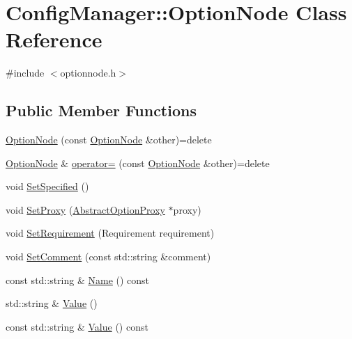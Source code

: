 \hypertarget{class_config_manager_1_1_option_node}{}\section{Config\+Manager\+:\+:Option\+Node Class Reference}
\label{class_config_manager_1_1_option_node}


{\ttfamily \#include $<$optionnode.\+h$>$}

\subsection*{Public Member Functions}
\begin{DoxyCompactItemize}
\item 
\hyperlink{class_config_manager_1_1_option_node_a645c010a3f2e7e8f46cb5aab37d64e05}{Option\+Node} (const \hyperlink{class_config_manager_1_1_option_node}{Option\+Node} \&other)=delete
\item 
\hyperlink{class_config_manager_1_1_option_node}{Option\+Node} \& \hyperlink{class_config_manager_1_1_option_node_a8b5464fb5566388ebbb8ea614972d3ea}{operator=} (const \hyperlink{class_config_manager_1_1_option_node}{Option\+Node} \&other)=delete
\item 
void \hyperlink{class_config_manager_1_1_option_node_a552addaf613da2184eebee5580cdb72c}{Set\+Specified} ()
\item 
void \hyperlink{class_config_manager_1_1_option_node_a6b11e372911679bd045e3ee1f43cf4ba}{Set\+Proxy} (\hyperlink{class_config_manager_1_1_abstract_option_proxy}{Abstract\+Option\+Proxy} $\ast$proxy)
\item 
void \hyperlink{class_config_manager_1_1_option_node_adfb4172e5929b7927243b60ba8d28485}{Set\+Requirement} (Requirement requirement)
\item 
void \hyperlink{class_config_manager_1_1_option_node_a58f8440e7549ce5785db09886e79e2a5}{Set\+Comment} (const std\+::string \&comment)
\item 
const std\+::string \& \hyperlink{class_config_manager_1_1_option_node_af9e6b47860fc8718236e3fe29f043cd0}{Name} () const 
\item 
std\+::string \& \hyperlink{class_config_manager_1_1_option_node_aa33beb6d850388f3f6a41386d32164f1}{Value} ()
\item 
const std\+::string \& \hyperlink{class_config_manager_1_1_option_node_a3cbcb849cc14c06121f658b4aab2f8de}{Value} () const 
\item 

\end{DoxyCompactItemize}

